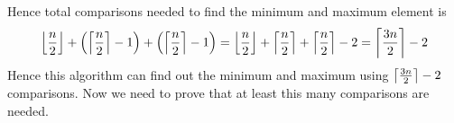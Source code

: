 \documentclass[a4paper, 11pt]{article}
\begin{document}
{Hence total comparisons needed to find the minimum and maximum element is $$\left\lfloor\frac{n}2\right\rfloor+ \left(\left\lceil\frac{n}2\right\rceil-1\right)+\left(\left\lceil\frac{n}2\right\rceil-1\right)=\left\lfloor\frac{n}2\right\rfloor+\left\lceil\frac{n}2\right\rceil+\left\lceil\frac{n}2\right\rceil-2= \left\lceil\frac{3n}2\right\rceil-2 $$Hence this algorithm can find out the minimum and maximum using $\left\lceil\frac{3n}2\right\rceil-2$ comparisons. Now we need to prove that at least this many comparisons are needed. 

}

\end{document}

